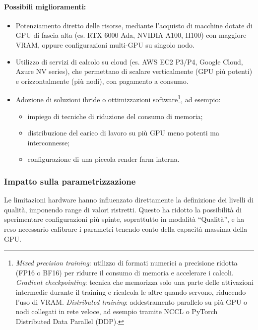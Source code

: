 \paragraph{Possibili miglioramenti:}
\begin{itemize}
	\item Potenziamento diretto delle risorse, mediante l'acquisto di macchine dotate di GPU di fascia alta (es. RTX 6000 Ada, NVIDIA A100, H100) con maggiore VRAM, oppure configurazioni multi-GPU su singolo nodo.
	\item Utilizzo di servizi di calcolo su cloud (es. AWS EC2 P3/P4, Google Cloud, Azure NV series), che permettano di scalare verticalmente (GPU più potenti) e orizzontalmente (più nodi), con pagamento a consumo.
	\item Adozione di soluzioni ibride o ottimizzazioni software\footnote{%
		\emph{Mixed precision training}: utilizzo di formati numerici a precisione ridotta (FP16 o BF16) per ridurre il consumo di memoria e accelerare i calcoli.  
		\emph{Gradient checkpointing}: tecnica che memorizza solo una parte delle attivazioni intermedie durante il training e ricalcola le altre quando servono, riducendo l'uso di VRAM.  
		\emph{Distributed training}: addestramento parallelo su più GPU o nodi collegati in rete veloce, ad esempio tramite NCCL o PyTorch Distributed Data Parallel (DDP).  
	}, ad esempio:
	\begin{itemize}
		\item impiego di tecniche di riduzione del consumo di memoria;
		\item distribuzione del carico di lavoro su più GPU meno potenti ma interconnesse;
		\item configurazione di una piccola render farm interna.
	\end{itemize}
\end{itemize}

\subsubsection{Impatto sulla parametrizzazione}
Le limitazioni hardware hanno influenzato direttamente la definizione dei livelli di qualità, imponendo range di valori ristretti.  
Questo ha ridotto la possibilità di sperimentare configurazioni più spinte, soprattutto in modalità ``Qualità'', e ha reso necessario calibrare i parametri tenendo conto della capacità massima della GPU.

